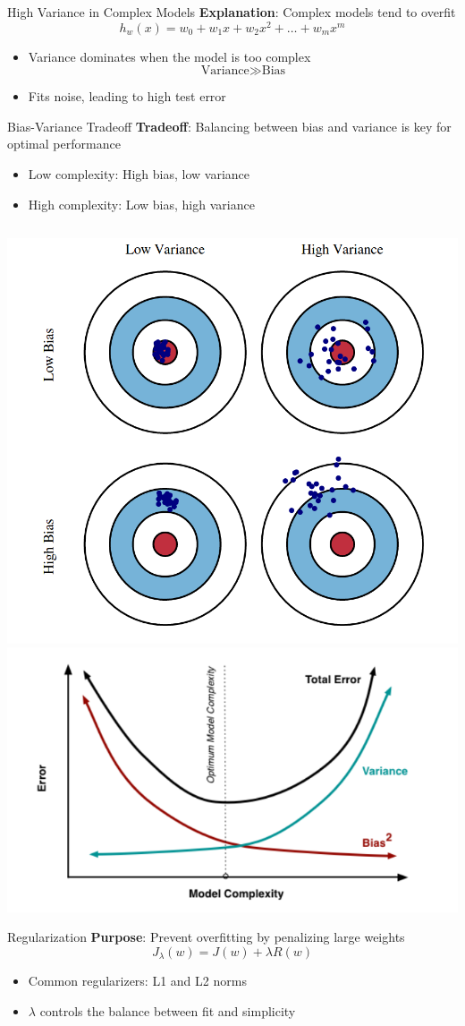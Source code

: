\documentclass[serif, aspectratio=169]{beamer}
\begin{document}
\begin{frame}{High Variance in Complex Models}
    \textbf{Explanation}: Complex models tend to overfit
    \[
    h_w(x) = w_0 + w_1 x + w_2 x^2 + \dots + w_m x^m
    \]
    \begin{itemize}
        \item Variance dominates when the model is too complex
        \[
        \text{Variance} \gg \text{Bias}
        \]
        \item Fits noise, leading to high test error
    \end{itemize}
\end{frame}

\begin{frame}{Bias-Variance Tradeoff}
    \textbf{Tradeoff}: Balancing between bias and variance is key for optimal performance
    \begin{itemize}
        \item Low complexity: High bias, low variance
        \item High complexity: Low bias, high variance
    \end{itemize}
    \[
    \]
    \begin{center}
    \includegraphics[width=0.35\linewidth]{pic/bias-variance.png}
    \hspace{0.25cm}
    \includegraphics[width=0.5\linewidth]{pic/bias-variance2.png}
 \end{center}

\end{frame}

\begin{frame}{Regularization}
    \textbf{Purpose}: Prevent overfitting by penalizing large weights
    \[
    J_{\lambda}(w) = J(w) + \lambda R(w)
    \]
    \begin{itemize}
        \item Common regularizers: L1 and L2 norms
        \item \( \lambda \) controls the balance between fit and simplicity
    \end{itemize}
\end{frame}
\end{document}
